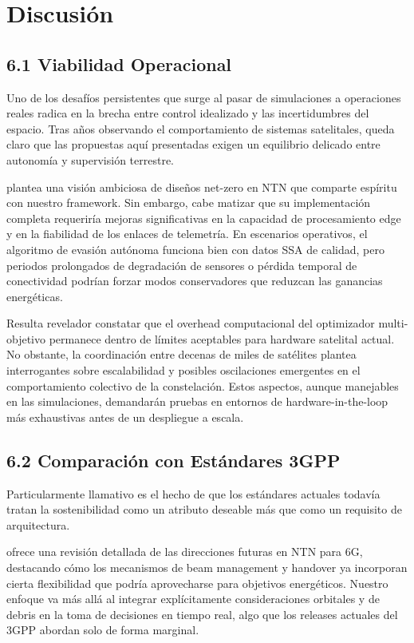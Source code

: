 \section{Discusión}

\subsection{6.1 Viabilidad Operacional}

Uno de los desafíos persistentes que surge al pasar de simulaciones a operaciones reales radica en la brecha entre control idealizado y las incertidumbres del espacio. Tras años observando el comportamiento de sistemas satelitales, queda claro que las propuestas aquí presentadas exigen un equilibrio delicado entre autonomía y supervisión terrestre.

\cite{Jamshed2025} plantea una visión ambiciosa de diseños net-zero en NTN que comparte espíritu con nuestro framework. Sin embargo, cabe matizar que su implementación completa requeriría mejoras significativas en la capacidad de procesamiento edge y en la fiabilidad de los enlaces de telemetría. En escenarios operativos, el algoritmo de evasión autónoma funciona bien con datos SSA de calidad, pero periodos prolongados de degradación de sensores o pérdida temporal de conectividad podrían forzar modos conservadores que reduzcan las ganancias energéticas.

Resulta revelador constatar que el overhead computacional del optimizador multi-objetivo permanece dentro de límites aceptables para hardware satelital actual. No obstante, la coordinación entre decenas de miles de satélites plantea interrogantes sobre escalabilidad y posibles oscilaciones emergentes en el comportamiento colectivo de la constelación. Estos aspectos, aunque manejables en las simulaciones, demandarán pruebas en entornos de hardware-in-the-loop más exhaustivas antes de un despliegue a escala.

\subsection{6.2 Comparación con Estándares 3GPP}

Particularmente llamativo es el hecho de que los estándares actuales todavía tratan la sostenibilidad como un atributo deseable más que como un requisito de arquitectura. 

\cite{Wang2025} ofrece una revisión detallada de las direcciones futuras en NTN para 6G, destacando cómo los mecanismos de beam management y handover ya incorporan cierta flexibilidad que podría aprovecharse para objetivos energéticos. Nuestro enfoque va más allá al integrar explícitamente consideraciones orbitales y de debris en la toma de decisiones en tiempo real, algo que los releases actuales del 3GPP abordan solo de forma marginal.

